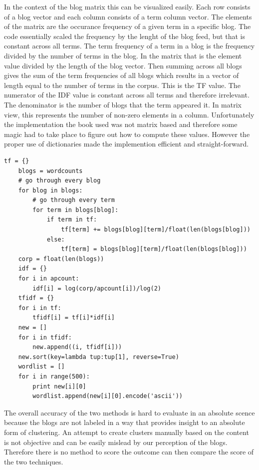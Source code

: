	In the context of the blog matrix this can be visualized easily. Each row consists of a blog vector and each column consists of a term column vector. The elements of the matrix are the occurance frequency of a given term in a specific blog. The code essentially scaled the frequency by the lenght of the blog feed, but that is constant across all terms. The term frequency of a term in a blog is the frequency divided by the number of terms in the blog. In the matrix that is the element value divided by the length of the blog vector. Then summing across all blogs gives the sum of the term frequencies of all blogs which results in a vector of length equal to the number of terms in the corpus. This is the TF value. 	The numerator of the IDF value is constant across all terms and therefore irrelevant. The denominator is the number of blogs that the term appeared it. In matrix view, this represents the number of non-zero elements in a column.
Unfortunately the implementation the book used was not matrix based and therefore some magic had to take place to figure out how to compute these values. However the proper use of dictionaries made the implemention efficient and straight-forward.




\begin{lstlisting}
tf = {}
    blogs = wordcounts
    # go through every blog
    for blog in blogs:
        # go through every term
        for term in blogs[blog]:
            if term in tf: 
                tf[term] += blogs[blog][term]/float(len(blogs[blog])) 
            else:
                tf[term] = blogs[blog][term]/float(len(blogs[blog])) 
    corp = float(len(blogs))
    idf = {}
    for i in apcount:
        idf[i] = log(corp/apcount[i])/log(2)
    tfidf = {}
    for i in tf:
        tfidf[i] = tf[i]*idf[i]
    new = []
    for i in tfidf:
        new.append((i, tfidf[i]))
    new.sort(key=lambda tup:tup[1], reverse=True)
    wordlist = []
    for i in range(500):
        print new[i][0]
        wordlist.append(new[i][0].encode('ascii'))

\end{lstlisting}

The overall accuracy of the two methods is hard to evaluate in an absolute scence because the blogs are not labeled in a way that provides insight to an absolute form of clustering. An attempt to create clusters manually based on the content is not objective and can be easily mislead by our perception of the blogs. Therefore there is no method to score the outcome can then compare the score of the two techniques. 


